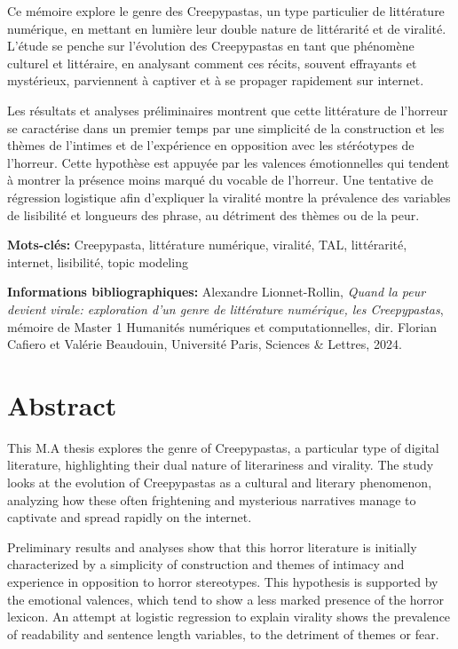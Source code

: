 \documentclass[12pt,a4paper,oneside,titlepage]{book} %
\begin{document}
Ce mémoire explore le genre des Creepypastas, un type particulier de littérature numérique, en mettant en lumière leur double nature de littérarité et de viralité. L'étude se penche sur l'évolution des Creepypastas en tant que phénomène culturel et littéraire, en analysant comment ces récits, souvent effrayants et mystérieux, parviennent à captiver et à se propager rapidement sur internet.

Les résultats et analyses préliminaires montrent que cette littérature de l'horreur se caractérise dans un premier temps par une simplicité de la construction et les thèmes de l'intimes et de l'expérience en opposition avec les stéréotypes de l'horreur. Cette hypothèse est appuyée par les valences émotionnelles qui tendent à montrer la présence moins marqué du vocable de l'horreur. Une tentative de régression logistique afin d'expliquer la viralité montre la prévalence des variables de lisibilité et longueurs des phrase, au détriment des thèmes ou de la peur.

\medskip

\textbf{Mots-clés:} Creepypasta, littérature numérique, viralité, TAL, littérarité, internet, lisibilité, topic modeling

\textbf{Informations bibliographiques:} Alexandre Lionnet-Rollin, \textit{Quand la peur devient virale: exploration d'un genre de littérature numérique, les Creepypastas}, mémoire de Master 1 \og Humanités numériques et computationnelles\fg{}, dir. Florian Cafiero et Valérie Beaudouin, Université Paris, Sciences \& Lettres, 2024.



\section*{Abstract}

This M.A thesis explores the genre of Creepypastas, a particular type of digital literature, highlighting their dual nature of literariness and virality. The study looks at the evolution of Creepypastas as a cultural and literary phenomenon, analyzing how these often frightening and mysterious narratives manage to captivate and spread rapidly on the internet.

Preliminary results and analyses show that this horror literature is initially characterized by a simplicity of construction and themes of intimacy and experience in opposition to horror stereotypes. This hypothesis is supported by the emotional valences, which tend to show a less marked presence of the horror lexicon. An attempt at logistic regression to explain virality shows the prevalence of readability and sentence length variables, to the detriment of themes or fear.
\end{document}
